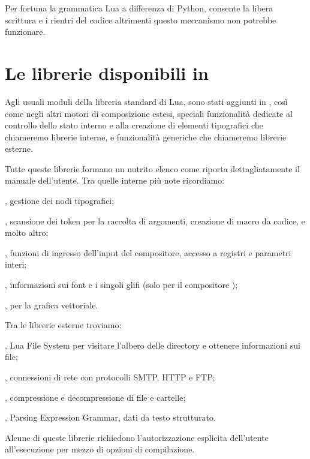 Per fortuna la grammatica Lua a differenza di Python, consente la libera
scrittura e i rientri del codice altrimenti questo meccanismo non potrebbe
funzionare.


\section{Le librerie disponibili in \LuaTeX}

Agli usuali moduli della libreria standard di Lua, sono stati aggiunti in
\LuaTeX{}, così come negli altri motori di composizione estesi, speciali
funzionalità dedicate al controllo dello stato interno e alla creazione di
elementi tipografici che chiameremo librerie interne, e funzionalità generiche
che chiameremo librerie esterne.

Tutte queste librerie formano un nutrito elenco come riporta dettagliatamente il
manuale dell'utente. Tra quelle interne più note ricordiamo:
\begin{compactitemize}
\item {}, gestione dei nodi tipografici;
\item {}, scansione dei token per la raccolta di argomenti, creazione
di macro da codice, e molto altro;
\item {}, funzioni di ingresso dell'input del compositore, accesso a
registri e parametri interi;
\item {}, informazioni sui font e i singoli glifi (solo per il
compositore );
\item {},  per la grafica vettoriale.
\end{compactitemize}

Tra le librerie esterne troviamo:
\begin{compactitemize}
\item {}, Lua File System per visitare l'albero delle directory e
ottenere informazioni sui file;
\item {}, connessioni di rete con protocolli SMTP, HTTP e FTP;
\item {}, compressione e decompressione di file e cartelle;
\item {}, Parsing Expression Grammar, dati da testo strutturato.
\end{compactitemize}

Alcune di queste librerie richiedono l'autorizzazione esplicita dell'utente
all'esecuzione per mezzo di opzioni di compilazione.


